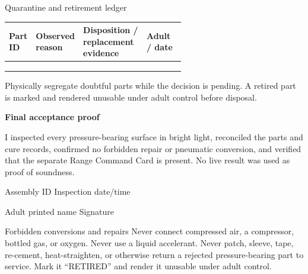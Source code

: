 \begin{teloscard}{Quarantine and retirement ledger}
\begin{tabularx}{\linewidth}{@{}p{0.13\linewidth}p{0.24\linewidth}L p{0.22\linewidth}@{}}
\textbf{Part ID} & \textbf{Observed reason} & \textbf{Disposition / replacement evidence} &
\textbf{Adult / date}\\ \midrule
&&&\\[1.3em]
&&&\\[1.3em]
&&&\\
\end{tabularx}
Physically segregate doubtful parts while the decision is pending. A retired
part is marked and rendered unusable under adult control before disposal.
\end{teloscard}

\begin{telosframe}
\textbf{Final acceptance proof}\par
I inspected every pressure-bearing surface in bright light, reconciled the
parts and cure records, confirmed no forbidden repair or pneumatic conversion,
and verified that the separate Range Command Card is present. No live result
was used as proof of soundness.\par
\vspace{.7em}
Assembly ID \hrulefill\quad Inspection date/time \hrulefill\par
\vspace{.7em}
Adult printed name \hrulefill\quad Signature \hrulefill
\end{telosframe}

\begin{teloshazard}{Forbidden conversions and repairs}
Never connect compressed air, a compressor, bottled gas, or oxygen. Never use a
liquid accelerant. Never patch, sleeve, tape, re-cement, heat-straighten, or
otherwise return a rejected pressure-bearing part to service. Mark it
``RETIRED'' and render it unusable under adult control.
\end{teloshazard}

